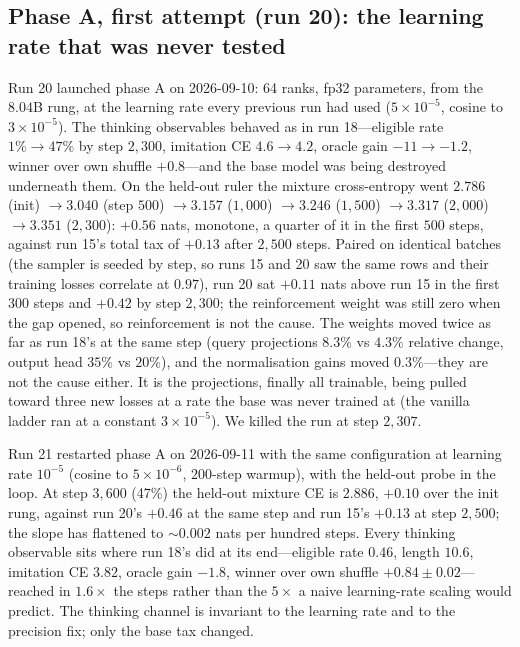 \documentclass{article} %
\begin{document}
\subsection{Phase A, first attempt (run 20): the learning rate that was never tested}
\label{sec:run20}

Run 20 launched phase A on 2026-09-10: 64 ranks, fp32 parameters, from the $8.04$B rung, at the learning rate every previous run had used ($5\times10^{-5}$, cosine to $3\times10^{-5}$). The thinking observables behaved as in run 18---eligible rate $1\% \to 47\%$ by step $2{,}300$, imitation CE $4.6 \to 4.2$, oracle gain $-11 \to -1.2$, winner over own shuffle $+0.8$---and the base model was being destroyed underneath them. On the held-out ruler the mixture cross-entropy went $2.786$ (init) $\to 3.040$ (step $500$) $\to 3.157$ ($1{,}000$) $\to 3.246$ ($1{,}500$) $\to 3.317$ ($2{,}000$) $\to 3.351$ ($2{,}300$): $+0.56$ nats, monotone, a quarter of it in the first $500$ steps, against run 15's total tax of $+0.13$ after $2{,}500$ steps. Paired on identical batches (the sampler is seeded by step, so runs 15 and 20 saw the same rows and their training losses correlate at $0.97$), run 20 sat $+0.11$ nats above run 15 in the first $300$ steps and $+0.42$ by step $2{,}300$; the reinforcement weight was still zero when the gap opened, so reinforcement is not the cause. The weights moved twice as far as run 18's at the same step (query projections $8.3\%$ vs $4.3\%$ relative change, output head $35\%$ vs $20\%$), and the normalisation gains moved $0.3\%$---they are not the cause either. It is the projections, finally all trainable, being pulled toward three new losses at a rate the base was never trained at (the vanilla ladder ran at a constant $3\times10^{-5}$). We killed the run at step $2{,}307$.

Run 21 restarted phase A on 2026-09-11 with the same configuration at learning rate $10^{-5}$ (cosine to $5\times10^{-6}$, $200$-step warmup), with the held-out probe in the loop. At step $3{,}600$ (47\%) the held-out mixture CE is $2.886$, $+0.10$ over the init rung, against run 20's $+0.46$ at the same step and run 15's $+0.13$ at step $2{,}500$; the slope has flattened to ${\sim}0.002$ nats per hundred steps. Every thinking observable sits where run 18's did at its end---eligible rate $0.46$, length $10.6$, imitation CE $3.82$, oracle gain $-1.8$, winner over own shuffle $+0.84 \pm 0.02$---reached in $1.6\times$ the steps rather than the $5\times$ a naive learning-rate scaling would predict. The thinking channel is invariant to the learning rate and to the precision fix; only the base tax changed.
\end{document}

